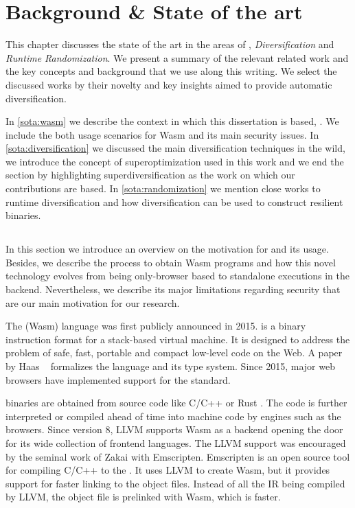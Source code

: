 \chapter{Background \& State of the art}

This chapter discusses the state of the art in the areas of \emph{\wasm}, \emph{Diversification} and \emph{Runtime Randomization}. We present a summary of the relevant related work and the key concepts and background that we use along this writing. 
We select the discussed works by their novelty and key insights aimed to provide automatic diversification. 

In \autoref{sota:wasm} we describe the context in which this dissertation is based, \wasm. We include the both usage scenarios for Wasm and its main security issues. In \autoref{sota:diversification} we discussed the main diversification techniques in the wild, we introduce the concept of superoptimization used in this work and we end the section by highlighting superdiversification as the work on which our contributions are based. In \autoref{sota:randomization} we mention close works to runtime diversification and how diversification can be used to construct resilient binaries. 

\section{\wasm}
\label{sota:wasm}

In this section we introduce an overview on the motivation for \wasm and its usage. Besides, we describe the process to obtain Wasm programs and how this novel technology evolves from being only-browser based to standalone executions in the backend. Nevertheless, we describe its major limitations regarding security that are our main motivation for our research.

The \wasm (Wasm) language was first publicly announced in 2015. \wasm is a binary instruction format for a stack-based virtual machine.
It is designed to address the problem of safe, fast, portable and compact low-level code on the Web.
A paper by Haas \etal~\cite{Haas_2017} formalizes the language and its type system.
Since 2015, major web browsers have implemented support for the standard.

\wasm binaries are obtained from source code like C/C++ or Rust \cite{Hilbig2021AnES}. The \wasm code is further interpreted or compiled ahead of time into machine code by engines such as the browsers. Since version 8, LLVM supports Wasm as a backend opening the door for its wide collection of frontend languages. The LLVM support was encouraged by the seminal work of Zakai \etal with Emscripten.
Emscripten is an open source tool for compiling C/C++ to the \wasm. It uses LLVM to create Wasm, but it provides support for faster linking to the object files. Instead of all the IR being compiled by LLVM, the object file is prelinked with Wasm, which is faster. 

